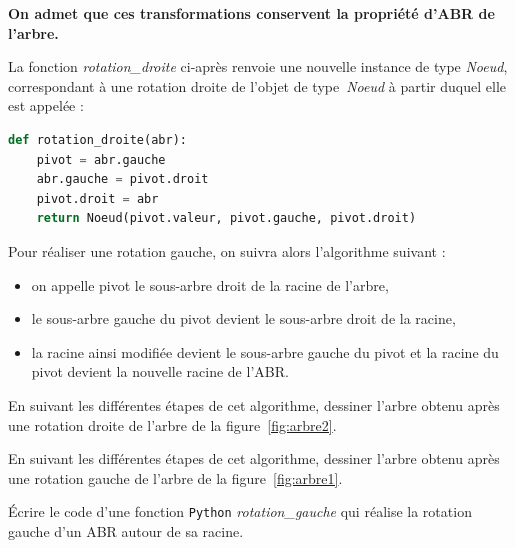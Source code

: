 \documentclass[a4paper, noanswers, addpoints, 12pt]{exam}
\begin{document}
\begin{questions}
{\centering
    
    \par}

\begin{center}
    \textbf{On admet que ces transformations conservent la propriété d'ABR de l'arbre.}
\end{center}

\newpage

La fonction \textit{rotation\_droite} ci-après renvoie une nouvelle instance de type \textit{Noeud}, correspondant à une rotation droite de l'objet de type~\textit{Noeud} à partir duquel elle est appelée :

\begin{lstlisting}[style=mystyle, language=Python]
def rotation_droite(abr):
    pivot = abr.gauche
    abr.gauche = pivot.droit
    pivot.droit = abr
    return Noeud(pivot.valeur, pivot.gauche, pivot.droit)
\end{lstlisting}


Pour réaliser une rotation gauche, on suivra alors l'algorithme suivant :
\begin{itemize}
    \item on appelle pivot le sous-arbre droit de la racine de l'arbre,
    \item le sous-arbre gauche du pivot devient le sous-arbre droit de la racine,
    \item la racine ainsi modifiée devient le sous-arbre gauche du pivot et la racine du
pivot devient la nouvelle racine de l'ABR.
\end{itemize}

\question[1] En suivant les différentes étapes de cet algorithme, dessiner l'arbre obtenu
après une rotation droite de l'arbre de la figure~\ref{fig:arbre2}.

\question[2] En suivant les différentes étapes de cet algorithme, dessiner l'arbre obtenu
après une rotation gauche de l'arbre de la figure~\ref{fig:arbre1}.

\question[2] Écrire le code d'une fonction {\tt Python} \textit{rotation\_gauche} qui réalise la
rotation gauche d'un ABR autour de sa racine.

\end{questions}
\end{document}
